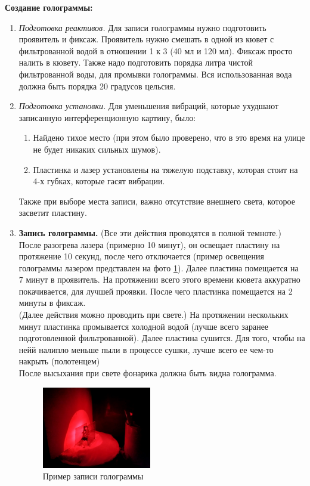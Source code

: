 \documentclass[aps,twocolumn,secnumarabic,balancelastpage,amsmath,amssymb,nofootinbib, floatfix]{revtex4-1}
\begin{document}
\textbf{Создание голограммы:}
\begin{enumerate}
	\item\textit{Подготовка реактивов.} Для записи голограммы нужно подготовить проявитель и фиксаж. Проявитель нужно смешать в одной из кювет с фильтрованной водой в отношении 1 к 3 (40 мл и 120 мл). Фиксаж просто налить в кювету. Также надо подготовить порядка литра чистой фильтрованной воды, для промывки голограммы. Вся использованная вода должна быть порядка 20 градусов цельсия. 
	\item\textit{Подготовка установки.} Для уменьшения вибраций, которые ухудшают записанную интерференционную картину, было:
	\begin{enumerate}
		\item Найдено тихое место (при этом было проверено, что в это время на улице не будет никаких сильных шумов).
		\item Пластинка и лазер установлены на тяжелую подставку, которая стоит на 4-х губках, которые гасят вибрации.
	\end{enumerate}
	Также при выборе места записи, важно отсутствие внешнего света, которое засветит пластину.
	\item\textbf{Запись голограммы.} (Все эти действия проводятся в полной темноте.)\\После разогрева лазера (примерно 10 минут), он освещает пластину на протяжение 10 секунд, после чего отключается (пример освещения голограммы лазером представлен на фото \ref{fig:laser_lighting}). Далее пластина помещается на 7 минут в проявитель. На протяжении всего этого времени кювета аккуратно покачивается, для лучшей проявки. После чего пластинка помещается на 2 минуты в фиксаж. \\
	(Далее действия можно проводить при свете.) На протяжении нескольких минут пластинка промывается холодной водой (лучше всего заранее подготовленной фильтрованной). Далее пластина сушится. Для того, чтобы на нейй налипло меньше пыли в процессе сушки, лучше всего ее чем-то накрыть (полотенцем)\\
	После высыхания при свете фонарика должна быть видна голограмма.
	\begin{figure}[H]
		\centering
		\includegraphics[width=0.45\textwidth]{images/laser_lighting.jpeg}
		\caption{Пример записи голограммы}
		\label{fig:laser_lighting}
	\end{figure}
\end{enumerate}
\end{document}
